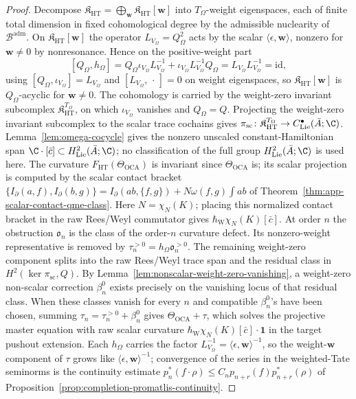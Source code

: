 \begin{proof}
Decompose \(\mathfrak K_{\mathrm{HT}}=\bigoplus_{\mathbf w}
\mathfrak K_{\mathrm{HT}}[\mathbf w]\) into \(T_\Omega\)-weight
eigenspaces, each of finite total dimension in fixed cohomological
degree by the admissible nuclearity of \(\mathcal B^{\mathrm{adm}}\).
On \(\mathfrak K_{\mathrm{HT}}[\mathbf w]\) the operator
\(L_{V_\Omega}=Q_\Omega^2\) acts by the scalar
\(\langle\epsilon,\mathbf w\rangle\), nonzero for \(\mathbf w\ne0\) by
nonresonance.  Hence on the positive-weight part
\[
  [Q_\Omega,h_\Omega]
  =Q_\Omega\iota_{V_\Omega}L_{V_\Omega}^{-1}
  +\iota_{V_\Omega}L_{V_\Omega}^{-1}Q_\Omega
  =L_{V_\Omega}L_{V_\Omega}^{-1}=\mathrm{id},
\]
using \([Q_\Omega,\iota_{V_\Omega}]=L_{V_\Omega}\) and
\([L_{V_\Omega},\,\cdot\,]=0\) on weight eigenspaces, so
\(\mathfrak K_{\mathrm{HT}}[\mathbf w]\) is \(Q_\Omega\)-acyclic for
\(\mathbf w\ne0\).  The cohomology is carried by the weight-zero
invariant subcomplex \(\mathfrak K_{\mathrm{HT}}^{T_\Omega}\), on which
\(\iota_{V_\Omega}\) vanishes and \(Q_\Omega=Q\).  Projecting the
weight-zero invariant subcomplex to the scalar trace cochains gives
\(\pi_{\mathrm{sc}}\colon\mathfrak K_{\mathrm{HT}}^{T_\Omega}\to
C^\bullet_{\mathrm{Lie}}(\bar A;\C)\).  Lemma~\ref{lem:omega-cocycle}
gives the nonzero unscaled constant-Hamiltonian span
\(\C\cdot[\bar c]\subset H^2_{\mathrm{Lie}}(\bar A;\C)\); no
classification of the full group \(H^2_{\mathrm{Lie}}(\bar A;\C)\) is
used here.  The curvature
\(F_{\mathrm{HT}}(\Theta_{\mathrm{OCA}})\) is invariant since
\(\Theta_{\mathrm{OCA}}\) is; its scalar projection is computed by the
scalar contact bracket
\(\{I_\partial(a,f),I_\partial(b,g)\}=I_\partial(ab,\{f,g\})
+N\omega(f,g)\int ab\) of
Theorem~\ref{thm:app-scalar-contact-qme-class}.  Here
\(N=\chi_N(K)\); placing this normalized contact bracket in the raw
Rees/Weyl commutator gives
\(\hbar_{\mathrm{W}}\chi_N(K)[\bar c]\).  At order \(n\) the obstruction
\(\mathfrak o_n\) is the class of
the order-\(n\) curvature defect.  Its nonzero-weight representative is
removed by \(\tau_n^{>0}=h_\Omega\mathfrak o_n^{>0}\).  The remaining
weight-zero component splits into the raw Rees/Weyl trace span and the
residual class in \(H^2(\ker\pi_{\mathrm{sc}},Q)\).  By
Lemma~\ref{lem:nonscalar-weight-zero-vanishing}, a weight-zero
non-scalar correction \(\beta_n^0\) exists precisely on the vanishing
locus of that residual class.  When these classes vanish for every
\(n\) and compatible \(\beta_n^0\)'s have been chosen, summing
\(\tau_n=\tau_n^{>0}+\beta_n^0\) gives
\(\Theta_{\mathrm{OCA}}+\tau\), which solves the projective master
equation with raw scalar curvature
\(\hbar_{\mathrm{W}}\chi_N(K)[\bar c]\cdot\mathbf 1\) in the target
pushout extension.
Each \(h_\Omega\) carries the factor
\(L_{V_\Omega}^{-1}=\langle\epsilon,\mathbf w\rangle^{-1}\), so the
weight-\(\mathbf w\) component of \(\tau\) grows like
\(\langle\epsilon,\mathbf w\rangle^{-1}\); convergence of the series in
the weighted-Tate seminorms is the continuity estimate
\(p^*_n(f\cdot\rho)\le C_np_{n+r}(f)p^*_{n+r}(\rho)\) of
Proposition~\ref{prop:completion-promatlis-continuity}.
\end{proof}

